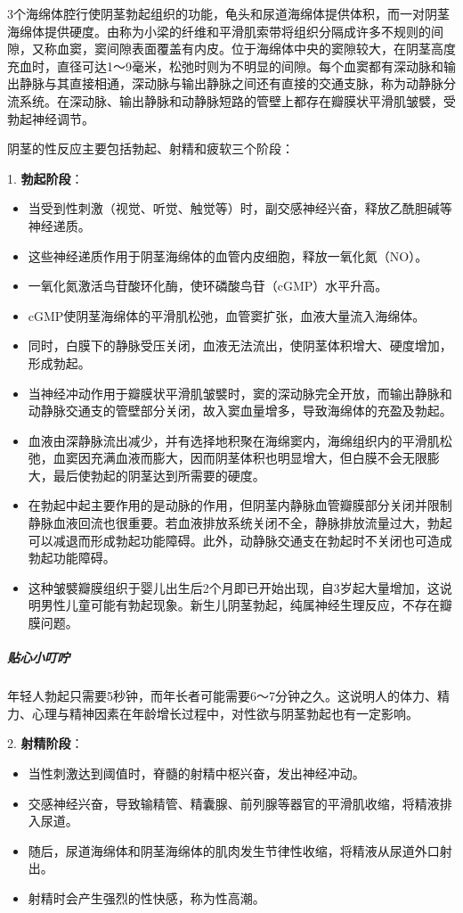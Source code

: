 3个海绵体腔行使阴茎勃起组织的功能，龟头和尿道海绵体提供体积，而一对阴茎海绵体提供硬度。由称为小梁的纤维和平滑肌索带将组织分隔成许多不规则的间隙，又称血窦，窦间隙表面覆盖有内皮。位于海绵体中央的窦隙较大，在阴茎高度充血时，直径可达1～9毫米，松弛时则为不明显的间隙。每个血窦都有深动脉和输出静脉与其直接相通，深动脉与输出静脉之间还有直接的交通支脉，称为动静脉分流系统。在深动脉、输出静脉和动静脉短路的管壁上都存在瓣膜状平滑肌皱襞，受勃起神经调节。

阴茎的性反应主要包括勃起、射精和疲软三个阶段：

1. \textbf{勃起阶段}：
  \begin{itemize}
  \item 当受到性刺激（视觉、听觉、触觉等）时，副交感神经兴奋，释放乙酰胆碱等神经递质。
  \item 这些神经递质作用于阴茎海绵体的血管内皮细胞，释放一氧化氮（NO）。
  \item 一氧化氮激活鸟苷酸环化酶，使环磷酸鸟苷（cGMP）水平升高。
  \item cGMP使阴茎海绵体的平滑肌松弛，血管窦扩张，血液大量流入海绵体。
  \item 同时，白膜下的静脉受压关闭，血液无法流出，使阴茎体积增大、硬度增加，形成勃起。
  \item 当神经冲动作用于瓣膜状平滑肌皱襞时，窦的深动脉完全开放，而输出静脉和动静脉交通支的管壁部分关闭，故入窦血量增多，导致海绵体的充盈及勃起。
  \item 血液由深静脉流出减少，并有选择地积聚在海绵窦内，海绵组织内的平滑肌松弛，血窦因充满血液而膨大，因而阴茎体积也明显增大，但白膜不会无限膨大，最后使勃起的阴茎达到所需要的硬度。
  \item 在勃起中起主要作用的是动脉的作用，但阴茎内静脉血管瓣膜部分关闭并限制静脉血液回流也很重要。若血液排放系统关闭不全，静脉排放流量过大，勃起可以减退而形成勃起功能障碍。此外，动静脉交通支在勃起时不关闭也可造成勃起功能障碍。
  \item 这种皱襞瓣膜组织于婴儿出生后2个月即已开始出现，自3岁起大量增加，这说明男性儿童可能有勃起现象。新生儿阴茎勃起，纯属神经生理反应，不存在瓣膜问题。
  \end{itemize}

\subparagraph{贴心小叮咛}

年轻人勃起只需要5秒钟，而年长者可能需要6～7分钟之久。这说明人的体力、精力、心理与精神因素在年龄增长过程中，对性欲与阴茎勃起也有一定影响。

2. \textbf{射精阶段}：
  \begin{itemize}
  \item 当性刺激达到阈值时，脊髓的射精中枢兴奋，发出神经冲动。
  \item 交感神经兴奋，导致输精管、精囊腺、前列腺等器官的平滑肌收缩，将精液排入尿道。
  \item 随后，尿道海绵体和阴茎海绵体的肌肉发生节律性收缩，将精液从尿道外口射出。
  \item 射精时会产生强烈的性快感，称为性高潮。
  \end{itemize}

